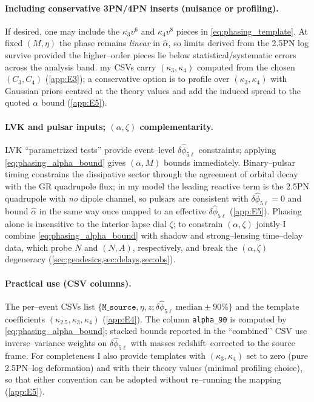 \documentclass{iopjournal}
\begin{document}
\paragraph{Including conservative 3PN/4PN inserts (nuisance or profiling).}
If desired, one may include the $\kappa_{3}v^{6}$ and $\kappa_{4}v^{8}$ pieces in \eqref{eq:phasing_template}. At fixed $(M,\eta)$ the phase remains \emph{linear} in $\widehat\alpha$, so limits derived from the 2.5PN log survive provided the higher–order pieces lie below statistical/systematic errors across the analysis band. my CSVs carry $(\kappa_{3},\kappa_{4})$ computed from the chosen $(C_{3},C_{4})$ (\cref{app:E3}); a conservative option is to profile over $(\kappa_{3},\kappa_{4})$ with Gaussian priors centred at the theory values and add the induced spread to the quoted $\alpha$ bound (\cref{app:E5}).

\paragraph{LVK and pulsar inputs; $(\alpha,\zeta)$ complementarity.}
LVK ``parametrized tests” provide event–level $\delta\hat\phi_{5\ell}$ constraints; applying \eqref{eq:phasing_alpha_bound} gives $(\alpha,M)$ bounds immediately. Binary–pulsar timing constrains the dissipative sector through the agreement of orbital decay with the GR quadrupole flux; in my model the leading reactive term is the 2.5PN quadrupole with \emph{no} dipole channel, so pulsars are consistent with $\delta\hat\phi_{5\ell}=0$ and bound $\widehat\alpha$ in the same way once mapped to an effective $\delta\hat\phi_{5\ell}$ (\cref{app:E5}). Phasing alone is insensitive to the interior lapse dial $\zeta$; to constrain $(\alpha,\zeta)$ jointly I combine \eqref{eq:phasing_alpha_bound} with shadow and strong–lensing time–delay data, which probe $N$ and $(N,A)$, respectively, and break the $(\alpha,\zeta)$ degeneracy (\cref{sec:geodesics,sec:delays,sec:obs}).

\paragraph{Practical use (CSV columns).}
The per–event CSVs list $\{\texttt{M\_source},\eta,z; \delta\hat\phi_{5\ell}\ \text{median}\pm90\%\}$ and the template coefficients $(\kappa_{2.5},\kappa_{3},\kappa_{4})$ (\cref{app:E4}). The column \texttt{alpha\_90} is computed by \eqref{eq:phasing_alpha_bound}; stacked bounds reported in the ``combined’’ CSV use inverse–variance weights on $\delta\hat\phi_{5\ell}$ with masses redshift–corrected to the source frame. For completeness I also provide templates with $(\kappa_{3},\kappa_{4})$ set to zero (pure 2.5PN–log deformation) and with their theory values (minimal profiling choice), so that either convention can be adopted without re–running the mapping (\cref{app:E5}).
\end{document}

